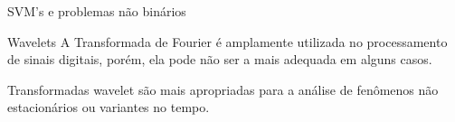 \documentclass[10pt]{beamer}
\begin{document}
\begin{frame}{SVM's e problemas não binários}



\end{frame}

\begin{frame}{Wavelets}
    A Transformada de Fourier é amplamente utilizada no processamento de sinais digitais, 
    porém, ela pode não ser a mais adequada em alguns casos.

    Transformadas wavelet são mais apropriadas para a análise de fenômenos não 
    estacionários ou variantes no tempo.
\end{frame}
\end{document}
